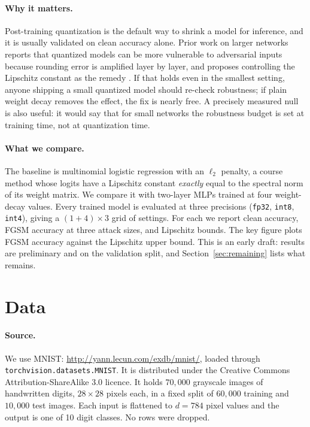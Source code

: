 \documentclass{article}
\newcommand{\fp}{\texttt{fp32}}
\newcommand{\ieight}{\texttt{int8}}
\newcommand{\ifour}{\texttt{int4}}
\begin{document}
\paragraph{Why it matters.} Post-training quantization is the default way to shrink a model for inference, and it is usually validated on clean accuracy alone. Prior work on larger networks reports that quantized models can be more vulnerable to adversarial inputs because rounding error is amplified layer by layer, and proposes controlling the Lipschitz constant as the remedy \citep{lin2019defensive}. If that holds even in the smallest setting, anyone shipping a small quantized model should re-check robustness; if plain weight decay removes the effect, the fix is nearly free. A precisely measured null is also useful: it would say that for small networks the robustness budget is set at training time, not at quantization time.

\paragraph{What we compare.} The baseline is multinomial logistic regression with an $\ell_2$ penalty, a course method whose logits have a Lipschitz constant \emph{exactly} equal to the spectral norm of its weight matrix. We compare it with two-layer MLPs trained at four weight-decay values. Every trained model is evaluated at three precisions (\fp{}, \ieight{}, \ifour{}), giving a $(1 + 4) \times 3$ grid of settings. For each we report clean accuracy, FGSM accuracy at three attack sizes, and Lipschitz bounds. The key figure plots FGSM accuracy against the Lipschitz upper bound. This is an early draft: results are preliminary and on the validation split, and Section~\ref{sec:remaining} lists what remains.


\section{Data}
\label{sec:data}

\paragraph{Source.} We use MNIST: \url{http://yann.lecun.com/exdb/mnist/}, loaded through \texttt{torchvision.datasets.MNIST}. It is distributed under the Creative Commons Attribution-ShareAlike 3.0 licence. It holds $70{,}000$ grayscale images of handwritten digits, $28 \times 28$ pixels each, in a fixed split of $60{,}000$ training and $10{,}000$ test images. Each input is flattened to $d = 784$ pixel values and the output is one of 10 digit classes. No rows were dropped.
\end{document}
